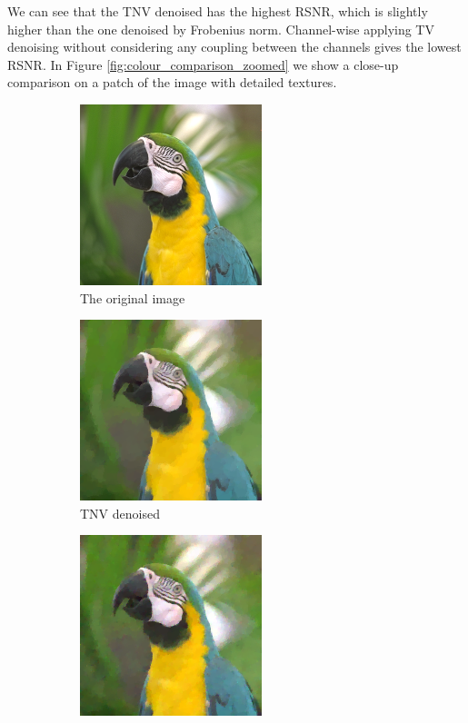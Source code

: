 \documentclass{article}
\begin{document}
We can see that the TNV denoised has the highest RSNR, which is slightly higher than the one denoised by Frobenius norm. Channel-wise applying TV denoising without considering any coupling between the channels gives the lowest RSNR. In Figure \ref{fig:colour_comparison_zoomed} we show a close-up comparison on a patch of the image with detailed textures.

\begin{figure}[ht]     
    \centering
    \begin{subfigure}[b]{0.24\textwidth}
        \centering
        \includegraphics[scale=2.5,trim={80 117 78 45},clip=true]{images/colour.png}
        \caption{The original image}
        \label{fig:Zoomedcolour}
    \end{subfigure}
    \begin{subfigure}[b]{0.24\textwidth}
        \centering
        \includegraphics[scale=2.5,trim={80 117 78 45},clip=true]{images/TNVdenoised_colour.png}
        \caption{TNV denoised}
        \label{fig:ZoomedTNVdenoised_colour}
    \end{subfigure}
    \begin{subfigure}[b]{0.24\textwidth}
        \centering
        \includegraphics[scale=2.5,trim={80 117 78 45},clip=true]{images/FrobeniusNormdenoised_colour.png}

\end{subfigure}
\end{figure}
\end{document}
